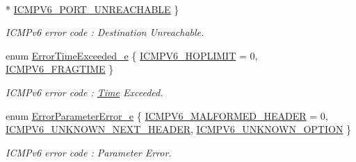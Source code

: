 \begin{DoxyCompactItemize}
\\*
\hyperlink{classns3_1_1Icmpv6Header_a2609b9581c3de3d6bbf8d55f5adf0d1daa4d55a0485155408f083e4fadcfbee48}{I\+C\+M\+P\+V6\+\_\+\+P\+O\+R\+T\+\_\+\+U\+N\+R\+E\+A\+C\+H\+A\+B\+LE}
 \}\begin{DoxyCompactList}\small\item\em I\+C\+M\+Pv6 error code \+: Destination Unreachable. \end{DoxyCompactList}
\item 
enum \hyperlink{classns3_1_1Icmpv6Header_a643af752203ad4456f89d3d1ab49943a}{Error\+Time\+Exceeded\+\_\+e} \{ \hyperlink{classns3_1_1Icmpv6Header_a643af752203ad4456f89d3d1ab49943aa2f477ba611ff7d0606adbca6c61e318d}{I\+C\+M\+P\+V6\+\_\+\+H\+O\+P\+L\+I\+M\+IT} = 0, 
\hyperlink{classns3_1_1Icmpv6Header_a643af752203ad4456f89d3d1ab49943aa5798a6dc190dfc603258e1313a4266a1}{I\+C\+M\+P\+V6\+\_\+\+F\+R\+A\+G\+T\+I\+ME}
 \}\begin{DoxyCompactList}\small\item\em I\+C\+M\+Pv6 error code \+: \hyperlink{classns3_1_1Time}{Time} Exceeded. \end{DoxyCompactList}
\item 
enum \hyperlink{classns3_1_1Icmpv6Header_ae9230cd167393f553a3c2ded106858ca}{Error\+Parameter\+Error\+\_\+e} \{ \hyperlink{classns3_1_1Icmpv6Header_ae9230cd167393f553a3c2ded106858caa7dd2df96e3d38d1988dbfc92f7fea0cb}{I\+C\+M\+P\+V6\+\_\+\+M\+A\+L\+F\+O\+R\+M\+E\+D\+\_\+\+H\+E\+A\+D\+ER} = 0, 
\hyperlink{classns3_1_1Icmpv6Header_ae9230cd167393f553a3c2ded106858caa0eae2e0ddc20524b6a988de9631096c6}{I\+C\+M\+P\+V6\+\_\+\+U\+N\+K\+N\+O\+W\+N\+\_\+\+N\+E\+X\+T\+\_\+\+H\+E\+A\+D\+ER}, 
\hyperlink{classns3_1_1Icmpv6Header_ae9230cd167393f553a3c2ded106858caa4712d4dbbcd93e660a8ae14f50726629}{I\+C\+M\+P\+V6\+\_\+\+U\+N\+K\+N\+O\+W\+N\+\_\+\+O\+P\+T\+I\+ON}
 \}\begin{DoxyCompactList}\small\item\em I\+C\+M\+Pv6 error code \+: Parameter Error. \end{DoxyCompactList}
\end{DoxyCompactItemize}
